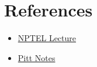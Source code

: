 \documentclass{article}
\begin{document}
\section{References}
\begin{itemize}
    \item \href{https://www.youtube.com/watch?v=4vryB1QhBNc}{NPTEL Lecture}
    \item \href{https://people.cs.pitt.edu/~jlee/papers/cs3750_rnn_lstm_slides.pdf}{Pitt Notes}
\end{itemize}
\end{document}
